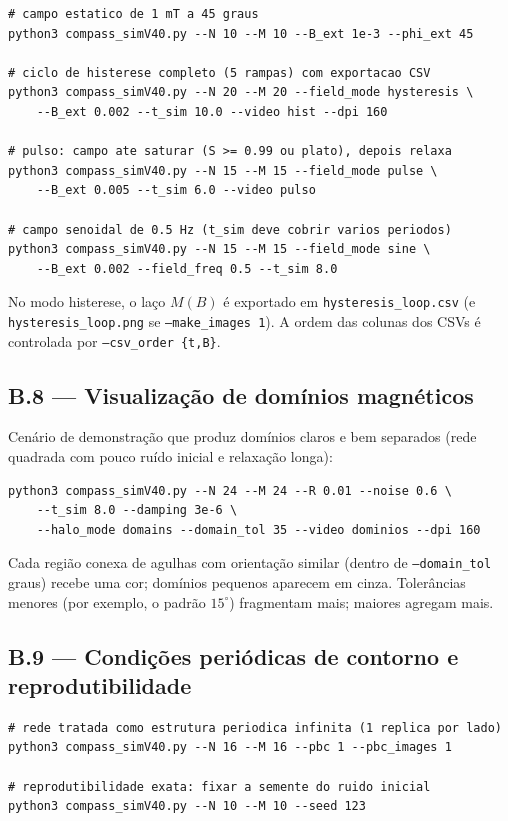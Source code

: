 \documentclass[11pt,a4paper]{article}
\newcommand{\code}[1]{\texttt{#1}}
\begin{document}
\begin{verbatim}
# campo estatico de 1 mT a 45 graus
python3 compass_simV40.py --N 10 --M 10 --B_ext 1e-3 --phi_ext 45

# ciclo de histerese completo (5 rampas) com exportacao CSV
python3 compass_simV40.py --N 20 --M 20 --field_mode hysteresis \
    --B_ext 0.002 --t_sim 10.0 --video hist --dpi 160

# pulso: campo ate saturar (S >= 0.99 ou plato), depois relaxa
python3 compass_simV40.py --N 15 --M 15 --field_mode pulse \
    --B_ext 0.005 --t_sim 6.0 --video pulso

# campo senoidal de 0.5 Hz (t_sim deve cobrir varios periodos)
python3 compass_simV40.py --N 15 --M 15 --field_mode sine \
    --B_ext 0.002 --field_freq 0.5 --t_sim 8.0
\end{verbatim}
No modo histerese, o laço $M(B)$ é exportado em
\code{hysteresis\_loop.csv} (e \code{hysteresis\_loop.png} se
\code{--make\_images 1}). A ordem das colunas dos CSVs é controlada por
\code{--csv\_order \{t,B\}}.

\subsection*{B.8 --- Visualização de domínios magnéticos}

Cenário de demonstração que produz domínios claros e bem separados
(rede quadrada com pouco ruído inicial e relaxação longa):
\begin{verbatim}
python3 compass_simV40.py --N 24 --M 24 --R 0.01 --noise 0.6 \
    --t_sim 8.0 --damping 3e-6 \
    --halo_mode domains --domain_tol 35 --video dominios --dpi 160
\end{verbatim}
Cada região conexa de agulhas com orientação similar (dentro de
\code{--domain\_tol} graus) recebe uma cor; domínios pequenos aparecem
em cinza. Tolerâncias menores (por exemplo, o padrão $15^\circ$)
fragmentam mais; maiores agregam mais.

\subsection*{B.9 --- Condições periódicas de contorno e
reprodutibilidade}

\begin{verbatim}
# rede tratada como estrutura periodica infinita (1 replica por lado)
python3 compass_simV40.py --N 16 --M 16 --pbc 1 --pbc_images 1

# reprodutibilidade exata: fixar a semente do ruido inicial
python3 compass_simV40.py --N 10 --M 10 --seed 123
\end{verbatim}
\end{document}
